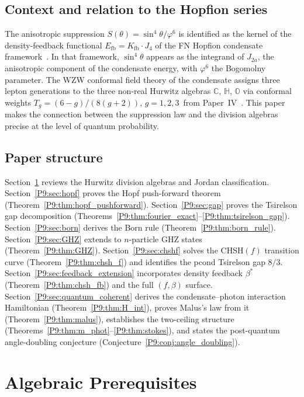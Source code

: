 \documentclass[11pt,a4paper]{article}
\theoremstyle{definition}
\theoremstyle{remark}
\newcommand{\vp}{\varphi}
\newcommand{\CC}{\mathbb{C}}
\newcommand{\HH}{\mathbb{H}}
\newcommand{\OO}{\mathbb{O}}
\begin{document}
\subsection{Context and relation to the Hopfion series}
 
The anisotropic suppression $S(\theta)=\sin^4\theta/\vp^6$ is
identified as the kernel of the density-feedback functional
 $E_\mathrm{fb} = K_\mathrm{fb}\cdot J_4$ of the FN Hopfion
condensate framework~\cite{Paper1}.
In that framework, $\sin^4\theta$ appears as the integrand of $J_{2a}$,
the anisotropic component of the condensate energy, with $\vp^6$ the
Bogomolny parameter.
The WZW conformal field theory of the condensate assigns three lepton
generations to the three non-real Hurwitz algebras $\CC$, $\HH$, $\OO$
via conformal weights $T_g = (6-g)/(8(g+2))$,
$g=1,2,3$~from Paper~IV~\cite{Paper4}.
This paper makes the connection between the suppression law and the division
algebras precise at the level of quantum probability.
 
\subsection{Paper structure}
 
Section~\ref{P9:sec:algebra} reviews the Hurwitz division algebras and Jordan classification.
Section~\ref{P9:sec:hopf} proves the Hopf push-forward theorem
(Theorem~\ref{P9:thm:hopf_pushforward}).
Section~\ref{P9:sec:gap} proves the Tsirelson gap decomposition
(Theorems~\ref{P9:thm:fourier_exact}--\ref{P9:thm:tsirelson_gap}).
Section~\ref{P9:sec:born} derives the Born rule
(Theorem~\ref{P9:thm:born_rule}).
Section~\ref{P9:sec:GHZ} extends to $n$-particle GHZ states
(Theorem~\ref{P9:thm:GHZ}).
Section~\ref{P9:sec:chshf} solves the CHSH$(f)$ transition curve
(Theorem~\ref{P9:thm:chsh_f}) and identifies the pcond Tsirelson gap $8/3$.
Section~\ref{P9:sec:feedback_extension} incorporates density feedback $\beta^*$
(Theorem~\ref{P9:thm:chsh_fb}) and the full $(f,\beta)$ surface.
Section~\ref{P9:sec:quantum_coherent} derives the condensate--photon
interaction Hamiltonian (Theorem~\ref{P9:thm:H_int}), proves Malus's law
from it (Theorem~\ref{P9:thm:malus}), establishes the two-ceiling structure
(Theorems~\ref{P9:thm:m_phot}--\ref{P9:thm:stokes}), and states the
post-quantum angle-doubling conjecture
(Conjecture~\ref{P9:conj:angle_doubling}).

 
\section{Algebraic Prerequisites}
\label{P9:sec:algebra}
 
\end{document}
